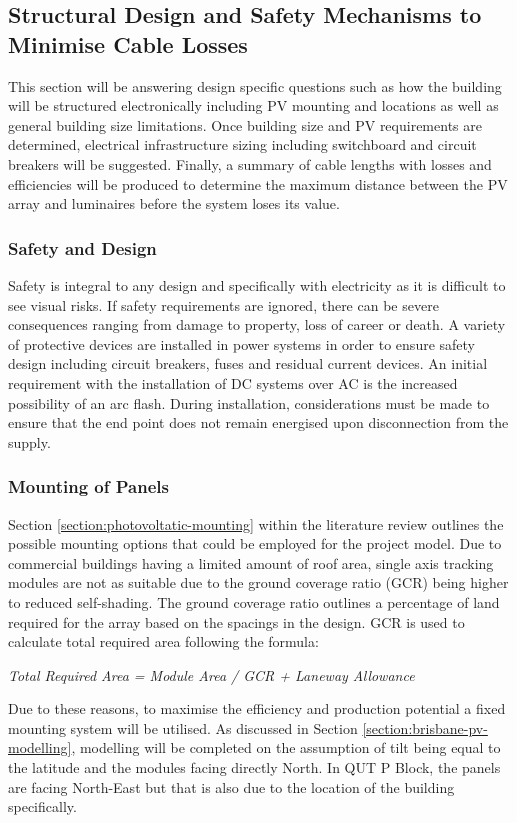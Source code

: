 \subsection{Structural Design and Safety Mechanisms to Minimise Cable Losses}

This section will be answering design specific questions such as how the building will be structured electronically including PV mounting and locations as well as general building size limitations. Once building size and PV requirements are determined, electrical infrastructure sizing including switchboard and circuit breakers will be suggested. Finally, a summary of cable lengths with losses and efficiencies will be produced to determine the maximum distance between the PV array and luminaires before the system loses its value.     

\subsubsection{Safety and Design}

Safety is integral to any design and specifically with electricity as it is difficult to see visual risks. If safety requirements are ignored, there can be severe consequences ranging from damage to property, loss of career or death. A variety of protective devices are installed in power systems in order to ensure safety design including circuit breakers, fuses and residual current devices. An initial requirement with the installation of DC systems over AC is the increased possibility of an arc flash. During installation, considerations must be made to ensure that the end point does not remain energised upon disconnection from the supply.   


\subsubsection{Mounting of Panels} \label{section:mounting-panels}

Section \ref{section:photovoltatic-mounting} within the literature review outlines the possible mounting options that could be employed for the project model. Due to commercial buildings having a limited amount of roof area, single axis tracking modules are not as suitable due to the ground coverage ratio (GCR) being higher to reduced self-shading. The ground coverage ratio outlines a percentage of land required for the array based on the spacings in the design. GCR is used to calculate total required area following the formula: 
\begin{center}
\textit{Total Required Area = Module Area / GCR + Laneway Allowance}
\end{center}  
Due to these reasons, to maximise the efficiency and production potential a fixed mounting system will be utilised. As discussed in Section \ref{section:brisbane-pv-modelling}, modelling will be completed on the assumption of tilt being equal to the latitude and the modules facing directly North. In QUT P Block, the panels are facing North-East but that is also due to the location of the building specifically.         

